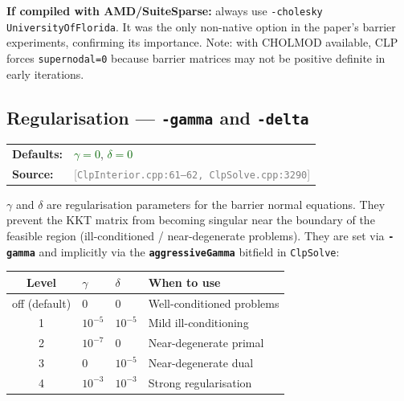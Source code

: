 \documentclass[11pt,a4paper]{article}
\newcommand{\param}[1]{\texttt{\textbf{#1}}}
\newcommand{\val}[1]{\texttt{#1}}
\newcommand{\src}[1]{\textcolor{gray}{\small[\texttt{#1}]}}
\newcommand{\default}[1]{\textcolor{darkgreen}{\texttt{#1}}}
\begin{document}
\begin{tipbox}
  \textbf{If compiled with AMD/SuiteSparse:} always use
  \val{-cholesky UniversityOfFlorida}. It was the only non-native option
  in the paper's barrier experiments, confirming its importance.
  Note: with CHOLMOD available, CLP forces \texttt{supernodal=0}
  because barrier matrices may not be positive definite in early iterations.
\end{tipbox}

\subsection{Regularisation --- \param{-gamma} and \param{-delta}}

\begin{tabular}{@{}ll@{}}
  \textbf{Defaults:} & \default{$\gamma = 0$}, \default{$\delta = 0$} \\
  \textbf{Source:}   & \src{ClpInterior.cpp:61--62, ClpSolve.cpp:3290}
\end{tabular}

\medskip
$\gamma$ and $\delta$ are regularisation parameters for the barrier normal equations.
They prevent the KKT matrix from becoming singular near the boundary of the feasible
region (ill-conditioned / near-degenerate problems).
They are set via \param{-gamma} and implicitly via the \param{aggressiveGamma} bitfield
in \texttt{ClpSolve}:

\begin{center}
\begin{tabular}{@{}clll@{}}
  \toprule
  \textbf{Level} & \textbf{$\gamma$} & \textbf{$\delta$} & \textbf{When to use} \\
  \midrule
  off (default) & $0$         & $0$         & Well-conditioned problems \\
  1             & $10^{-5}$   & $10^{-5}$   & Mild ill-conditioning \\
  2             & $10^{-7}$   & $0$         & Near-degenerate primal \\
  3             & $0$         & $10^{-5}$   & Near-degenerate dual \\
  4             & $10^{-3}$   & $10^{-3}$   & Strong regularisation \\
  \bottomrule
\end{tabular}
\end{center}

\end{document}
